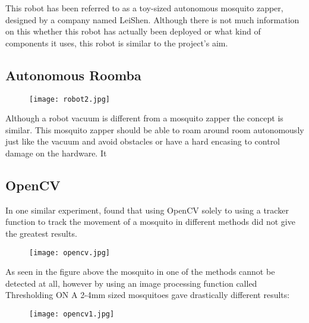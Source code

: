 \documentclass[11pt]{article}
\begin{document}
 This robot has been referred to as a toy-sized autonomous mosquito zapper, designed by a company named LeiShen. Although there is not much information on this whether this robot has actually been deployed or what kind of components it uses, this robot is similar to the project's aim.


\subsection{Autonomous Roomba}
  \begin{center}
	
	
	\begin{figure}[H]
		\centering
		\texttt{[image: robot2.jpg]}
		
		\label{fig:Robot}
	\end{figure}
\end{center}

Although a robot vacuum is different from a mosquito zapper the concept is similar. This mosquito zapper should be able to roam around room autonomously just like the vacuum and avoid obstacles or have a hard encasing to control damage on the hardware. It 

\subsection{OpenCV}

 In one similar experiment, found that using OpenCV solely to using a tracker function to track the movement of a mosquito in different methods did not give the greatest results. 
 \begin{center}
 	
 	
 	\begin{figure}[H]
 		\centering
 		\texttt{[image: opencv.jpg]}
 		
 		\label{fig:opencv}
 	\end{figure}
 \end{center}
 As seen in the figure above the mosquito in one of the methods cannot be detected at all, however by using an image processing function called Thresholding ON A 2-4mm sized mosquitoes gave drastically different results:
 
 \begin{center}
 	
 	
 	\begin{figure}[H]
 		\centering
 		\texttt{[image: opencv1.jpg]}
 		
 		
 	\end{figure}
 \end{center}
 
\end{document}
